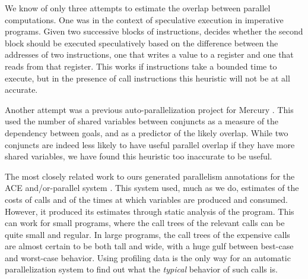 We know of only three attempts to estimate the overlap
between parallel computations.
One was in the context of speculative execution in imperative programs.
Given two successive blocks of instructions,
\cite{von_Praun:2007:implicit_parallelism_with_ordered_transactions}
decides whether the second block should be executed speculatively
based on the difference between the addresses of two instructions,
one that writes a value to a register and one that reads from that register.
This works if instructions take a bounded time to execute,
but in the presence of call instructions
this heuristic will not be at all accurate.

Another attempt was a previous auto-parallelization project for
Mercury \cite{tannier:2007:parallel-mercury}.
This used the number of shared variables between conjuncts
as a measure of the dependency between goals,
and as a predictor of the likely overlap.
While two conjuncts are indeed less likely
to have useful parallel overlap if they have more shared variables,
we have found this heuristic too inaccurate to be useful.

The most closely related work to ours
generated parallelism annotations for the ACE and/or-parallel system
\cite{Pontelli97automaticcompile-time}.
This system used, much as we do,
estimates of the costs of calls
and of the times at which variables are produced and consumed.
However, it produced its estimates through static analysis of the program.
This can work for small programs,
where the call trees of the relevant calls can be quite small and regular.
In large programs, the call trees of the expensive calls
are almost certain to be both tall and wide,
with a huge gulf between best-case and worst-case behavior.
Using profiling data is the only way
for an automatic parallelization system to find out
what the \emph{typical} behavior of such calls is.


